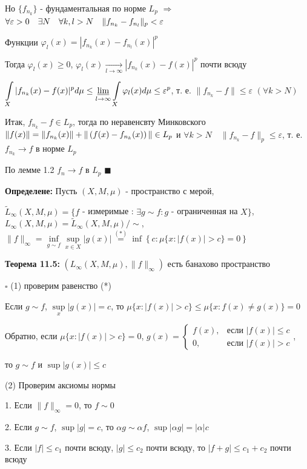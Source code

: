 \documentclass[a4paper]{report}
\newcommand*{\hm}[1]{#1\nobreak\discretionary{}%
            {\hbox{$\mathsurround=0pt #1$}}{}}
\begin{document}
Но $\{f_{n_k}\}$ - фундаментальная по норме $L_p$ $\Rightarrow$ $\forall\varepsilon>0\quad\exists N\quad\forall k,l>N\quad\|f_{n_k}\hm-f_{n_l}\|_p<\varepsilon$

Функции $\varphi_l(x)=|f_{n_k}(x)-f_{n_l}(x)|^p$

Тогда $\varphi_l(x)\ge0$, $\varphi_l(x)\xrightarrow[l\to\infty]{}|f_{n_k}(x)-f(x)|^p$ почти всюду

$\displaystyle\int\limits_X|f_{n_k}(x)-f(x)|^pd\mu\le\varliminf\limits_{l\to\infty}\displaystyle\int\limits_X\varphi_l(x)d\mu\le\varepsilon^p$, т. е. $\|f_{n_k}-f\|\le\varepsilon$ $(\forall k>N)$

Итак, $f_{n_k}-f\in L_p$, тогда по неравенсвту Минковского $\|f(x)\|=\|f_{n_k}(x)\|\hm+\|\left(f(x)-f_{n_k}(x)\right)\|\in L_p$ и $\forall k>N\quad\|f_{n_k}-f\|_p\le\varepsilon$, т. е. $f_{n_k}\to f$ в норме $L_p$

По лемме 1.2 $f_n\to f$ в $L_p$ $\blacksquare$
\bigskip

\noindent\textbf{Определене:} Пусть $(X,M,\mu)$ - пространство с мерой, 

$\tilde L_\infty(X,M,\mu)=\{f$ - измеримые : $\exists g\sim f\colon g$ - ограниченная на $X\}$, $L_\infty(X,M,\mu)=\tilde L_\infty(X,M,\mu)/\sim$, $\|f\|_\infty=\inf\limits_{g\sim f}\sup\limits_{x\in X}|g(x)|\stackrel{(*)}{=}\inf\left\{c\colon\mu\{x\colon|f(x)|>c\}=0\right\}$
\bigskip

\noindent\textbf{Теорема 11.5:} $\left(L_\infty(X,M,\mu),\|f\|_\infty\right)$ есть банахово пространство

\noindent $\square$ (1) проверим равенство (*)

Если $g\sim f$, $\sup\limits_x|g(x)|=c$, то $\mu\{x\colon|f(x)|>c\}\le\mu\{x\colon f(x)\ne g(x)\}=0$

Обратно, если $\mu\{x\colon|f(x)|>c\}=0$, $g(x)=\begin{cases}f(x),&\text{если }|f(x)|\le c\\0,&\text{если }|f(x)|>c\end{cases}$, 

то $g\sim f$ и $\sup|g(x)|\le c$

(2) Проверим аксиомы нормы

1. Если $\|f\|_\infty=0$, то $f\sim0$

2. Если $g\sim f$, $\sup|g|=c$, то $\alpha g\sim\alpha f$, $\sup|\alpha g|=|\alpha|c$

3. Если $|f|\le c_1$ почти всюду, $|g|\le c_2$ почти всюду, то $|f+g|\le c_1+c_2$ почти всюду
\end{document}
